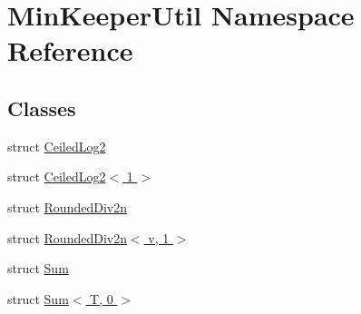 \hypertarget{namespaceMinKeeperUtil}{}\section{Min\+Keeper\+Util Namespace Reference}
\label{namespaceMinKeeperUtil}
\subsection*{Classes}
\begin{DoxyCompactItemize}
\item 
struct \hyperlink{structMinKeeperUtil_1_1CeiledLog2}{Ceiled\+Log2}
\item 
struct \hyperlink{structMinKeeperUtil_1_1CeiledLog2_3_011_01_4}{Ceiled\+Log2$<$ 1 $>$}
\item 
struct \hyperlink{structMinKeeperUtil_1_1RoundedDiv2n}{Rounded\+Div2n}
\item 
struct \hyperlink{structMinKeeperUtil_1_1RoundedDiv2n_3_01v_00_011_01_4}{Rounded\+Div2n$<$ v, 1 $>$}
\item 
struct \hyperlink{structMinKeeperUtil_1_1Sum}{Sum}
\item 
struct \hyperlink{structMinKeeperUtil_1_1Sum_3_01T_00_010_01_4}{Sum$<$ T, 0 $>$}
\end{DoxyCompactItemize}
